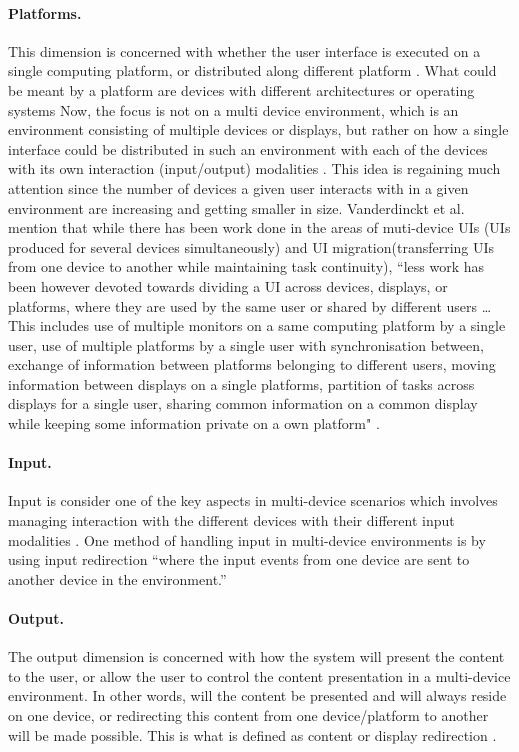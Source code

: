 \paragraph{Platforms.} This dimension is concerned with whether the user
interface is executed on a single computing platform, or distributed along
different platform \cite{elmqvist2011distributed}. What could be meant by a
platform are devices with different architectures or operating systems
Now, the focus is not on a multi device environment, which is an environment
consisting of multiple devices or displays, but rather on how a single interface
could be distributed in such an environment with each of the devices with its
own interaction (input/output) modalities \cite{elmqvist2011distributed}. This
idea is regaining much attention since the number of devices a given user
interacts with in a given environment are increasing and getting smaller in
size.
Vanderdinckt et al. mention that while there has been work done in the areas of
muti-device UIs (UIs produced for several devices simultaneously) and UI
migration(transferring UIs from one device to another while maintaining task
continuity), ``less work has been however devoted towards
dividing a UI across devices, displays, or platforms, where they are used by the
same user or shared by different users \ldots This includes use of
multiple monitors on a same computing platform by a single user, use of
multiple platforms by a single user with synchronisation between, exchange of
information between platforms belonging to different users, moving information
between displays on a single platforms, partition of tasks across displays for a
single user, sharing common information on a common display while keeping some
information private on a own platform" \cite{vanderdonckt2010distributed}.

\paragraph{Input.} Input is consider one of the key aspects in
multi-device scenarios which involves managing interaction with the different
devices with their different input modalities \cite{elmqvist2011distributed}.
One method of handling input in multi-device environments is by using input
redirection ``where the input events from one device are sent to another device
in the environment.''\cite{elmqvist2011distributed}

\paragraph{Output.} The output dimension is concerned with how the system will
present the content to the user, or allow the user to control the content
presentation in a multi-device environment. In other words, will the content be
presented and will always reside on one device, or
redirecting this content from one device/platform to another will be made
possible. This is what is defined as content or display redirection
\cite{elmqvist2011distributed}.

